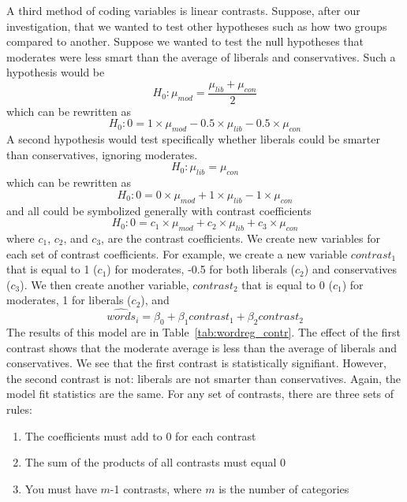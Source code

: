 A third method of coding variables is linear contrasts. Suppose, after our investigation, that we wanted to test other hypotheses such as how two groups compared to another. Suppose we wanted to test the null hypotheses that moderates were less smart than the average of liberals and conservatives. Such a hypothesis would be
\[
H_0:\mu_{mod}=\frac{\mu_{lib}+\mu_{con}}{2}
\]
which can be rewritten as
\[
H_0:0=1\times\mu_{mod}-0.5\times\mu_{lib}-0.5\times\mu_{con}
\]
A second hypothesis would test specifically whether liberals could be smarter than conservatives, ignoring moderates.
\[
H_0:\mu_{lib}=\mu_{con}
\]
which can be rewritten as
\[
H_0:0=0\times\mu_{mod}+1\times\mu_{lib}-1\times\mu_{con}
\]
and all could be symbolized generally with contrast coefficients
\[
H_0:0=c_1\times\mu_{mod}+c_2\times\mu_{lib}+c_3\times\mu_{con}
\]
where $c_1$, $c_2$, and $c_3$, are the contrast coefficients. We create new variables for each set of contrast coefficients. For example, we create a new variable $contrast_1$ that is equal to 1 ($c_1$) for moderates, -0.5 for both liberals ($c_2$) and conservatives ($c_3$). We then create another variable, $contrast_2$ that is equal to 0 ($c_1$) for moderates, 1 for liberals ($c_2$), and \[
\widehat{words}_i=\beta_0+\beta_1contrast_1+\beta_2contrast_2
\]
The results of this model are in Table~\ref{tab:wordreg_contr}. The effect of the first contrast shows that the moderate average is less than the average of liberals and conservatives. We see that the first contrast is statistically signifiant. However, the second contrast is not: liberals are not smarter than conservatives. Again, the model fit statistics are the same. For any set of contrasts, there are three sets of rules:
\begin{enumerate}
 \item The coefficients must add to 0 for each contrast
 \item The sum of the products of all contrasts must equal 0
 \item You must have $m$-1 contrasts, where $m$ is the number of categories
\end{enumerate}